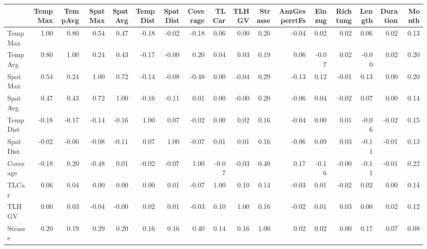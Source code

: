 \begin{tabular}{lrrrrrrrrrrrrrrrr}
\toprule
{} &  TempMax &  TempAvg &  SpatMax &  SpatAvg &  TempDist &  SpatDist &  Coverage &  TLCar &  TLHGV &  Strasse &  AnzGesperrtFs &  Einzug &  Richtung &  Length &  Duration &  Month \\
\midrule
TempMax       &     1.00 &     0.80 &     0.54 &     0.47 &     -0.18 &     -0.02 &     -0.18 &   0.06 &   0.00 &     0.20 &          -0.04 &    0.02 &      0.02 &    0.06 &      0.02 &   0.13 \\
TempAvg       &     0.80 &     1.00 &     0.24 &     0.43 &     -0.17 &     -0.00 &      0.20 &   0.04 &   0.03 &     0.19 &           0.06 &   -0.07 &      0.02 &   -0.00 &      0.02 &   0.20 \\
SpatMax       &     0.54 &     0.24 &     1.00 &     0.72 &     -0.14 &     -0.08 &     -0.48 &   0.00 &  -0.04 &     0.29 &          -0.13 &    0.12 &     -0.01 &    0.13 &      0.00 &   0.20 \\
SpatAvg       &     0.47 &     0.43 &     0.72 &     1.00 &     -0.16 &     -0.11 &      0.01 &   0.00 &  -0.00 &     0.20 &          -0.06 &    0.04 &     -0.02 &    0.07 &      0.00 &   0.14 \\
TempDist      &    -0.18 &    -0.17 &    -0.14 &    -0.16 &      1.00 &      0.07 &     -0.02 &   0.00 &   0.02 &     0.16 &          -0.04 &    0.00 &      0.01 &   -0.06 &     -0.02 &   0.15 \\
SpatDist      &    -0.02 &    -0.00 &    -0.08 &    -0.11 &      0.07 &      1.00 &     -0.07 &   0.01 &   0.01 &     0.16 &          -0.06 &    0.09 &      0.03 &   -0.11 &     -0.01 &   0.13 \\
Coverage      &    -0.18 &     0.20 &    -0.48 &     0.01 &     -0.02 &     -0.07 &      1.00 &  -0.07 &  -0.03 &     0.40 &           0.17 &   -0.16 &     -0.00 &   -0.11 &     -0.01 &   0.22 \\
TLCar         &     0.06 &     0.04 &     0.00 &     0.00 &      0.00 &      0.01 &     -0.07 &   1.00 &   0.10 &     0.14 &          -0.03 &    0.01 &     -0.02 &    0.02 &      0.00 &   0.14 \\
TLHGV         &     0.00 &     0.03 &    -0.04 &    -0.00 &      0.02 &      0.01 &     -0.03 &   0.10 &   1.00 &     0.16 &          -0.02 &    0.01 &      0.03 &    0.00 &      0.02 &   0.12 \\
Strasse       &     0.20 &     0.19 &     0.29 &     0.20 &      0.16 &      0.16 &      0.40 &   0.14 &   0.16 &     1.00 &           0.02 &    0.02 &      0.00 &    0.17 &      0.07 &   0.08 \\

\end{tabular}
